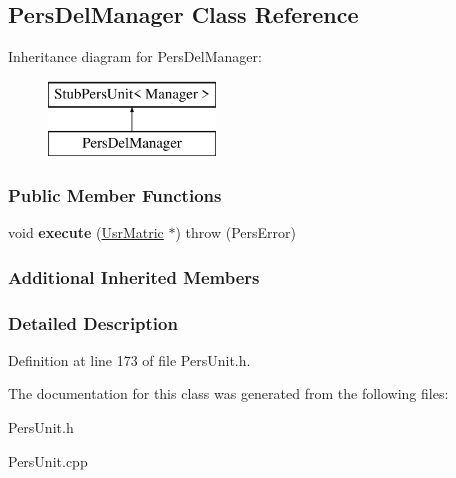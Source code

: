 \hypertarget{classPersDelManager}{\subsection{Pers\-Del\-Manager Class Reference}
\label{d6/d2b/classPersDelManager}
}
Inheritance diagram for Pers\-Del\-Manager\-:\begin{figure}[H]
\begin{center}
\leavevmode
\includegraphics[height=2.000000cm]{d6/d2b/classPersDelManager}
\end{center}
\end{figure}
\subsubsection*{Public Member Functions}
\begin{DoxyCompactItemize}
\item 
\hypertarget{classPersDelManager_acd2f4ba61e71dee6f71fe8c5e37535a7}{void {\bfseries execute} (\hyperlink{classUsrMatric}{Usr\-Matric} $\ast$)  throw (\-Pers\-Error)}\label{d6/d2b/classPersDelManager_acd2f4ba61e71dee6f71fe8c5e37535a7}

\end{DoxyCompactItemize}
\subsubsection*{Additional Inherited Members}


\subsubsection{Detailed Description}


Definition at line 173 of file Pers\-Unit.\-h.



The documentation for this class was generated from the following files\-:\begin{DoxyCompactItemize}
\item 
Pers\-Unit.\-h\item 
Pers\-Unit.\-cpp\end{DoxyCompactItemize}
